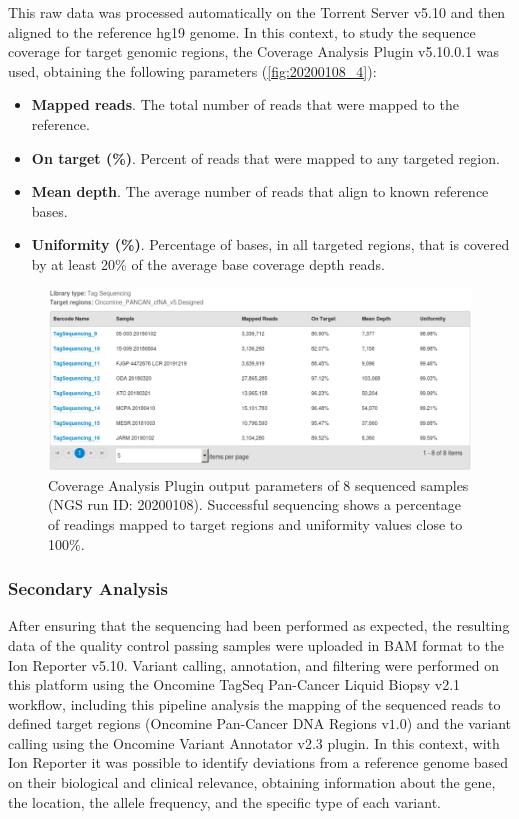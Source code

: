 This raw data was processed automatically on the Torrent Server\texttrademark{} v5.10 and then aligned to the reference hg19 genome. In this context, to study the sequence coverage for target genomic regions, the Coverage Analysis Plugin v5.10.0.1 was used, obtaining the following parameters (\autoref{fig:20200108_4}):
\begin{itemize}
    \item \textbf{Mapped reads}. The total number of reads that were mapped to the reference.
    \item \textbf{On target (\%)}. Percent of reads that were mapped to any targeted region.
    \item \textbf{Mean depth}. The average number of reads that align to known reference bases.
    \item \textbf{Uniformity (\%)}. Percentage of bases, in all targeted regions, that is covered by at least 20\% of the average base coverage depth reads.
\end{itemize}

\begin{figure}[ht]
    \centering
    \includegraphics[width=\textwidth]{Images/chapter_3/20200108/20200108_4.png}
    \caption{Coverage Analysis Plugin output parameters of 8 sequenced samples (NGS run ID: 20200108). Successful sequencing shows a percentage of readings mapped to target regions and uniformity values close to 100\%.}
    \label{fig:20200108_4}
\end{figure}

\subsubsection{Secondary Analysis} \label{Secondary_analysis}

After ensuring that the sequencing had been performed as expected, the resulting data of the quality control passing samples were uploaded in BAM format to the Ion Reporter\texttrademark{} v5.10. Variant calling, annotation, and filtering were performed on this platform using the Oncomine\texttrademark{} TagSeq Pan-Cancer Liquid Biopsy v2.1 workflow, including this pipeline analysis the mapping of the sequenced reads to defined target regions (Oncomine\texttrademark{} Pan-Cancer DNA Regions v$1.0$) and the variant calling using the Oncomine\texttrademark{} Variant Annotator v2.3 plugin. In this context, with Ion Reporter\texttrademark{} it was possible to identify deviations from a reference genome based on their biological and clinical relevance, obtaining information about the gene, the location, the allele frequency, and the specific type of each variant.

